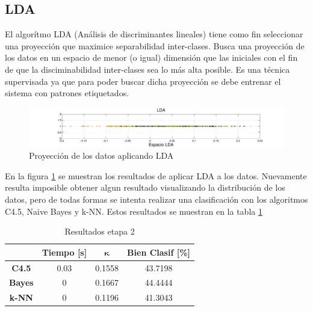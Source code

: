 \documentclass[12pt,a4paper,titlepage]{report}
\newcommand{\bs}{\boldsymbol}
\begin{document}
\subsection{LDA}
El algorítmo LDA (Análisis de discriminantes lineales) tiene como fin seleccionar una proyección que maximice separabilidad inter-clases. Busca una proyección de los datos en un espacio de menor (o igual) dimensión que las iniciales con el fin de que la disciminabilidad inter-clases sea lo más alta posible. Es una técnica supervisada ya que para poder buscar dicha proyección se debe entrenar el sistema con patrones etiquetados.\\

\begin{figure}
	\hspace{-2.5cm}
	\includegraphics[width=1.3\textwidth]{pics/lda_zoom.pdf}
	\caption{Proyección de los datos aplicando LDA}
	\label{fig:lda}
\end{figure}

En la figura \ref{fig:lda} se muestran los resultados de aplicar LDA a los datos. Nuevamente resulta imposible obtener algun resultado visualizando la distribución de los datos, pero de todas formas se intenta realizar una clasificación con los algoritmos C4.5, Naive Bayes y k-NN. Estos resultados se muestran en la tabla \ref{tab:resultados_LDA}

\begin{table}[H]
\centering
	\begin{tabular}{c|c|c|c|} 
	\cline{2-4}
	& \multicolumn{1}{c|}{\cellcolor[gray]{0.7} \textbf{Tiempo [s]}}  
	& \multicolumn{1}{c|}{\cellcolor[gray]{0.7} $\bs\kappa$}
	& \multicolumn{1}{c|}{\cellcolor[gray]{0.7} \textbf{Bien Clasif [\%]}} \\ \hline
	
	\multicolumn{1}{|c|}{\cellcolor[gray]{0.8} \textbf{C4.5}}   & 0.03 & 0.1558 & \cellcolor[gray]{0.9} 43.7198  \\ \hline
	\multicolumn{1}{|c|}{\cellcolor[gray]{0.8} \textbf{Bayes}}  & 0 & 0.1667 & \cellcolor[gray]{0.9} 44.4444 \\ \hline
	\multicolumn{1}{|c|}{\cellcolor[gray]{0.8} \textbf{k-NN}}   & 0 & 0.1196 & \cellcolor[gray]{0.9} 41.3043 \\ \hline
	\end{tabular} 
	\caption{Resultados etapa 2}
	\label{tab:resultados_LDA}
\end{table}
\end{document}
